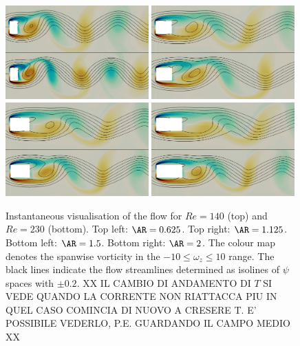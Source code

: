 \begin{figure}
  \centering
  \includegraphics[width=0.49\textwidth]{./fig/AR1s/AR0p625_Re140_Re230_omegaz.png}
  \includegraphics[width=0.49\textwidth]{./fig/AR1s/AR1p25_Re140_Re230_omegaz.png}
  \includegraphics[width=0.49\textwidth]{./fig/AR1s/AR1p5_Re140_Re230_omegaz.png}
  \includegraphics[width=0.49\textwidth]{./fig/AR1s/AR2_Re140_Re230_omegaz.png}
  \caption{Instantaneous visualisation of the flow for $Re=140$ (top) and $Re=230$ (bottom). Top left: $\AR=0.625$. Top right: $\AR=1.125$. Bottom left: $\AR=1.5$. Bottom right: $\AR=2$. The colour map denotes the spanwise vorticity in the $-10 \le \omega_z \le 10$ range. The black lines indicate the flow streamlines determined as isolines of $\psi$ spaces with $\pm 0.2$. XX IL CAMBIO DI ANDAMENTO DI $T$ SI VEDE QUANDO LA CORRENTE NON RIATTACCA PIU IN QUEL CASO COMINCIA DI NUOVO A CRESERE T. E' POSSIBILE VEDERLO, P.E. GUARDANDO IL CAMPO MEDIO XX}
  \label{fig:snap_Re140_Re230}
\end{figure}    


